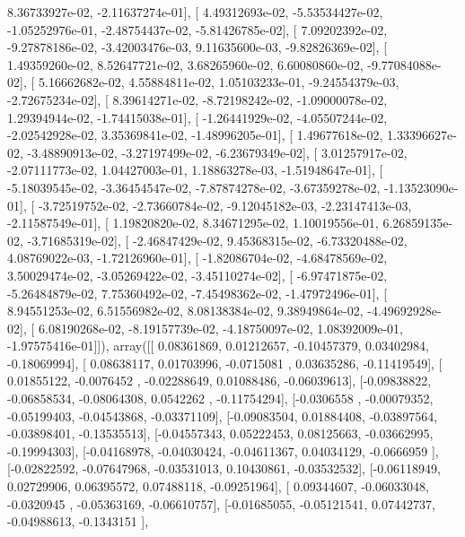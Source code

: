 \documentclass{article}
\begin{document}
          8.36733927e-02,  -2.11637274e-01],
       [  4.49312693e-02,  -5.53534427e-02,  -1.05252976e-01,
         -2.48754437e-02,  -5.81426785e-02],
       [  7.09202392e-02,  -9.27878186e-02,  -3.42003476e-03,
          9.11635600e-03,  -9.82826369e-02],
       [  1.49359260e-02,   8.52647721e-02,   3.68265960e-02,
          6.60080860e-02,  -9.77084088e-02],
       [  5.16662682e-02,   4.55884811e-02,   1.05103233e-01,
         -9.24554379e-03,  -2.72675234e-02],
       [  8.39614271e-02,  -8.72198242e-02,  -1.09000078e-02,
          1.29394944e-02,  -1.74415038e-01],
       [ -1.26441929e-02,  -4.05507244e-02,  -2.02542928e-02,
          3.35369841e-02,  -1.48996205e-01],
       [  1.49677618e-02,   1.33396627e-02,  -3.48890913e-02,
         -3.27197499e-02,  -6.23679349e-02],
       [  3.01257917e-02,  -2.07111773e-02,   1.04427003e-01,
          1.18863278e-03,  -1.51948647e-01],
       [ -5.18039545e-02,  -3.36454547e-02,  -7.87874278e-02,
         -3.67359278e-02,  -1.13523090e-01],
       [ -3.72519752e-02,  -2.73660784e-02,  -9.12045182e-03,
         -2.23147413e-03,  -2.11587549e-01],
       [  1.19820820e-02,   8.34671295e-02,   1.10019556e-01,
          6.26859135e-02,  -3.71685319e-02],
       [ -2.46847429e-02,   9.45368315e-02,  -6.73320488e-02,
          4.08769022e-03,  -1.72126960e-01],
       [ -1.82086704e-02,  -4.68478569e-02,   3.50029474e-02,
         -3.05269422e-02,  -3.45110274e-02],
       [ -6.97471875e-02,  -5.26484879e-02,   7.75360492e-02,
         -7.45498362e-02,  -1.47972496e-01],
       [  8.94551253e-02,   6.51556982e-02,   8.08138384e-02,
          9.38949864e-02,  -4.49692928e-02],
       [  6.08190268e-02,  -8.19157739e-02,  -4.18750097e-02,
          1.08392009e-01,  -1.97575416e-01]]), array([[ 0.08361869,  0.01212657, -0.10457379,  0.03402984, -0.18069994],
       [ 0.08638117,  0.01703996, -0.0715081 ,  0.03635286, -0.11419549],
       [ 0.01855122, -0.0076452 , -0.02288649,  0.01088486, -0.06039613],
       [-0.09838822, -0.06858534, -0.08064308,  0.0542262 , -0.11754294],
       [-0.0306558 , -0.00079352, -0.05199403, -0.04543868, -0.03371109],
       [-0.09083504,  0.01884408, -0.03897564, -0.03898401, -0.13535513],
       [-0.04557343,  0.05222453,  0.08125663, -0.03662995, -0.19994303],
       [-0.04168978, -0.04030424, -0.04611367,  0.04034129, -0.0666959 ],
       [-0.02822592, -0.07647968, -0.03531013,  0.10430861, -0.03532532],
       [-0.06118949,  0.02729906,  0.06395572,  0.07488118, -0.09251964],
       [ 0.09344607, -0.06033048, -0.0320945 , -0.05363169, -0.06610757],
       [-0.01685055, -0.05121541,  0.07442737, -0.04988613, -0.1343151 ],
\end{document}
